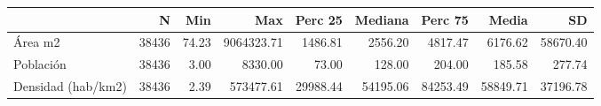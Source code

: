 \begin{table}
\centering
\begin{tabular}[t]{lrrrrrrrr}
\toprule
  & N & Min & Max & Perc 25 & Mediana & Perc 75 & Media & SD\\
\midrule
Área m2 & 38436 & \num{74.23} & \num{9064323.71} & \num{1486.81} & \num{2556.20} & \num{4817.47} & \num{6176.62} & \num{58670.40}\\
Población & 38436 & \num{3.00} & \num{8330.00} & \num{73.00} & \num{128.00} & \num{204.00} & \num{185.58} & \num{277.74}\\
Densidad (hab/km2) & 38436 & \num{2.39} & \num{573477.61} & \num{29988.44} & \num{54195.06} & \num{84253.49} & \num{58849.71} & \num{37196.78}\\
\bottomrule
\end{tabular}
\end{table}
